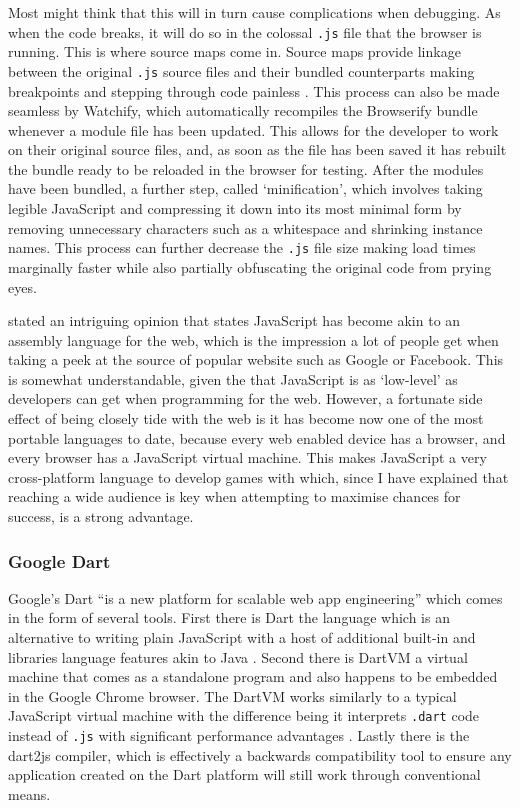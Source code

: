 \documentclass[final]{cmpreport}
\begin{document}

Most might think that this will in turn cause complications when debugging. As when the code breaks, it will do so in the colossal \texttt{.js} file that the browser is running. This is where source maps come in. Source maps provide linkage between the original \texttt{.js} source files and their bundled counterparts making breakpoints and stepping through code painless \citep{Seddon}. This process can also be made seamless by Watchify, which automatically recompiles the Browserify bundle whenever a module file has been updated. This allows for the developer to work on their original source files, and, as soon as the file has been saved it has rebuilt the bundle ready to be reloaded in the browser for testing. After the modules have been bundled, a further step, called `minification', which involves taking legible JavaScript and compressing it down into its most minimal form by removing unnecessary characters such as a whitespace and shrinking instance names. This process can further decrease the \texttt{.js} file size making load times marginally faster while also partially obfuscating the original code from prying eyes.

\cite{Hanselman} stated an intriguing opinion that states JavaScript has become akin to an assembly language for the web, which is the impression a lot of people get when taking a peek at the source of popular website such as Google or Facebook. This is somewhat understandable, given the that JavaScript is as `low-level' as developers can get when programming for the web. However, a fortunate side effect of being closely tide with the web is it has become now one of the most portable languages to date, because every web enabled device has a browser, and every browser has a JavaScript virtual machine. This makes JavaScript a very cross-platform language to develop games with which, since I have explained that reaching a wide audience is key when attempting to maximise chances for success, is a strong advantage.

\subsubsection{Google Dart}
Google's Dart ``is a new platform for scalable web app engineering'' which comes in the form of several tools. First there is Dart the language which is an alternative to writing plain JavaScript with a host of additional built-in and libraries language features akin to Java \cite{Fortuna}. Second there is DartVM a virtual machine that comes as a standalone program and also happens to be embedded in the Google Chrome browser. The DartVM works similarly to a typical JavaScript virtual machine with the difference being it interprets \texttt{.dart} code instead of \texttt{.js} with significant performance advantages \cite{Schneider}. Lastly there is the dart2js compiler, which is effectively a backwards compatibility tool to ensure any application created on the Dart platform will still work through conventional means.
\end{document}
